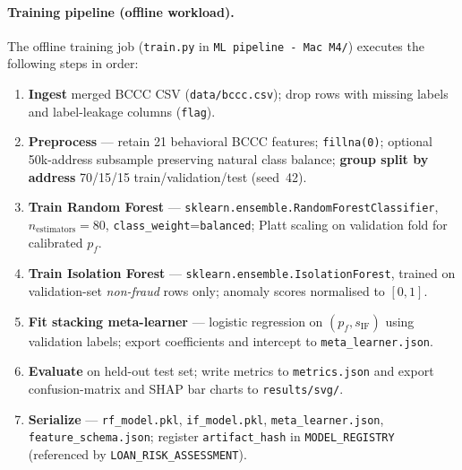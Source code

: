 \documentclass[12pt,a4paper]{report}
\begin{document}
\paragraph{Training pipeline (offline workload).}
The offline training job (\texttt{train.py} in \texttt{ML pipeline - Mac M4/}) executes the following steps in order:
\begin{enumerate}[noitemsep]
\item \textbf{Ingest} merged BCCC CSV (\texttt{data/bccc.csv}); drop rows with missing labels and label-leakage columns (\texttt{flag}).
\item \textbf{Preprocess} --- retain 21 behavioral BCCC features; \texttt{fillna(0)}; optional 50k-address subsample preserving natural class balance; \textbf{group split by address} 70/15/15 train/validation/test (seed~42).
\item \textbf{Train Random Forest} --- \texttt{sklearn.ensemble.RandomForestClassifier}, $n_{\text{estimators}}{=}80$, \texttt{class\_weight}{=}\texttt{balanced}; Platt scaling on validation fold for calibrated $p_f$.
\item \textbf{Train Isolation Forest} --- \texttt{sklearn.ensemble.IsolationForest}, trained on validation-set \textit{non-fraud} rows only; anomaly scores normalised to $[0,1]$.
\item \textbf{Fit stacking meta-learner} --- logistic regression on $(p_f, s_{\text{IF}})$ using validation labels; export coefficients and intercept to \texttt{meta\_learner.json}.
\item \textbf{Evaluate} on held-out test set; write metrics to \texttt{metrics.json} and export confusion-matrix and SHAP bar charts to \texttt{results/svg/}.
\item \textbf{Serialize} --- \texttt{rf\_model.pkl}, \texttt{if\_model.pkl}, \texttt{meta\_learner.json}, \texttt{feature\_schema.json}; register \texttt{artifact\_hash} in \texttt{MODEL\_REGISTRY} (referenced by \texttt{LOAN\_RISK\_ASSESSMENT}).
\end{enumerate}
\end{document}
